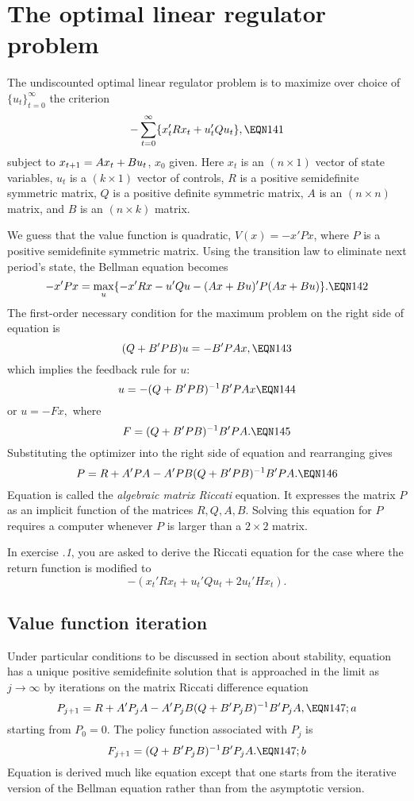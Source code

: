 \section{The optimal linear regulator problem}

 The undiscounted optimal linear regulator problem
is to maximize over choice of $\{u_t\}_{t=0}^\infty$ the criterion
$$ - \sum_{t=0}^\infty \{x'_t Rx_t+u'_tQu_t\},\EQN 141$$
subject to $x_{{t+1}}=Ax_t+Bu_t$, $x_0$ given.  Here $x_t$ is an
$(n\times 1)$ vector of state variables, $u_t$ is a $(k\times 1)$
vector of controls, $R$ is a positive semidefinite symmetric matrix,
$Q$ is a positive definite symmetric matrix, $A$ is an $(n\times n)$
matrix, and $B$ is an $(n\times k)$ matrix.

We guess that the
value function is quadratic, $V(x)= - x'Px$, where $P$ is a positive
semidefinite symmetric matrix.
Using the transition law to eliminate next period's state, the Bellman
equation becomes
$$ - x'Px=\max_u \{- x' Rx-u'Qu-(Ax+Bu)' P(Ax+Bu)\}.\EQN 142$$
The first-order necessary condition for the maximum problem on the
right side of equation  is
$$(Q+B'PB)u=-B'PAx,\EQN 143$$
which implies the feedback rule for $u$:
$$u=-(Q+B'PB)^{-1} B'PAx\EQN 144$$
or
$u=-Fx,$
where $$F=(Q+B'PB)^{-1}B'PA. \EQN 145$$
  Substituting the optimizer  into
the right side of equation  and rearranging gives
$$P=R+A'PA-A'PB(Q+B'PB)^{-1} B'PA.\EQN 146$$
Equation  is called the {\it algebraic matrix Riccati} equation.
It expresses the matrix $P$ as an implicit function of the matrices
$R,Q,A,B$.  Solving this equation for $P$ requires
a computer whenever $P$ is larger than a $2 \times 2$ matrix.

In exercise {\it \the\chapternum.1\/}, you are asked to derive the Riccati
equation for the case where the return function is
modified to
$$ -(  x_t' R x_t + u_t' Q u_t  + 2 u_t' H x_t) .$$


%
%
\subsection{Value function iteration}
  Under particular conditions to be discussed in section  about  stability,
equation  has a unique positive
semidefinite solution that is approached in the limit as $j\to\infty$ by
iterations on the matrix Riccati difference equation
$$P_{j+1}=R+A'P_j A-A'P_jB(Q+B'P_jB)^{-1} B'P_jA,\EQN 147;a$$
starting from $P_0=0$.
The policy function  associated with $P_{j}$ is
$$F_{j+1} =(Q+B'P_j B)^{-1}B'P_j A. \EQN 147;b$$
 Equation  is derived much like equation 
except that one starts from the iterative version of the Bellman
equation  rather than from the asymptotic version.

